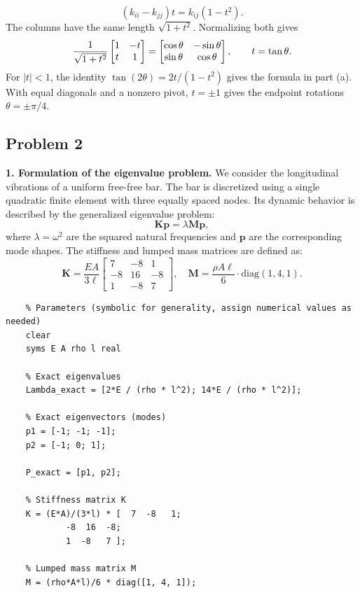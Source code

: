 \documentclass[12pt]{article}
\begin{document}
\begin{itemize}
         \[
            (k_{ii}-k_{jj})t=k_{ij}(1-t^2).
         \]
         The columns have the same length $\sqrt{1+t^2}$. Normalizing both gives
         \[
            \frac{1}{\sqrt{1+t^2}}\begin{bmatrix}1&-t\\t&1\end{bmatrix}
            =\begin{bmatrix}\cos\theta&-\sin\theta\\\sin\theta&\cos\theta\end{bmatrix},
            \qquad t=\tan\theta .
         \]
         For $|t|<1$, the identity $\tan(2\theta)=2t/(1-t^2)$ gives the formula in part (a). With equal diagonals and a nonzero pivot, $t=\pm1$ gives the endpoint rotations $\theta=\pm\pi/4$.
\end{itemize}


\subsection*{Problem 2}

\textbf{1. Formulation of the eigenvalue problem.} We consider the longitudinal vibrations of a uniform free-free bar. The bar is discretized using a single quadratic finite element with three equally spaced nodes. Its dynamic behavior is described by the generalized eigenvalue problem:
\[
   \mathbf{K} \mathbf{p} = \lambda \mathbf{M} \mathbf{p},
\]
where \( \lambda = \omega^2 \) are the squared natural frequencies and \( \mathbf{p} \) are the corresponding mode shapes. The stiffness and lumped mass matrices are defined as:
\[
   \mathbf{K} = \frac{EA}{3\ell}
   \begin{bmatrix}
      7  & -8 & 1  \\
      -8 & 16 & -8 \\
      1  & -8 & 7
   \end{bmatrix}, \quad
   \mathbf{M} = \frac{\rho A \ell}{6} \cdot \text{diag}(1, 4, 1).
\]

\begin{verbatim}
    % Parameters (symbolic for generality, assign numerical values as needed)
    clear
    syms E A rho l real

    % Exact eigenvalues 
    Lambda_exact = [2*E / (rho * l^2); 14*E / (rho * l^2)];

    % Exact eigenvectors (modes)
    p1 = [-1; -1; -1];
    p2 = [-1; 0; 1];

    P_exact = [p1, p2];

    % Stiffness matrix K
    K = (E*A)/(3*l) * [  7  -8   1;
            -8  16  -8;
            1  -8   7 ];

    % Lumped mass matrix M
    M = (rho*A*l)/6 * diag([1, 4, 1]);
\end{verbatim}
\end{document}
